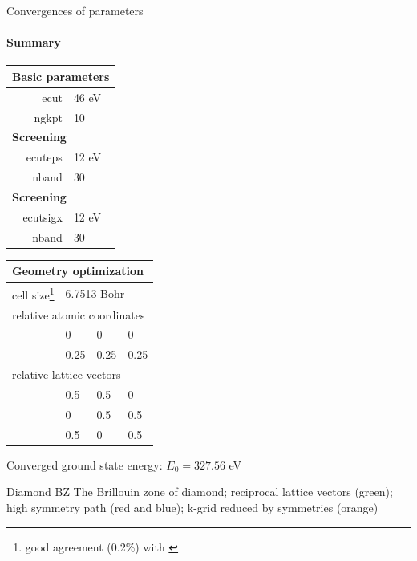\documentclass[fontsize=9pt]{beamer}
\begin{document}
\begin{frame}{Convergences of parameters}
     {
        \framesubtitle{Summary}
        \begin{center}
            \begin{tabular}{r l}
                \multicolumn{2}{l}{\textbf{Basic parameters}}
                \\\hline
                ecut & 46 eV \\
                ngkpt & 10
                \\\hline
                \multicolumn{2}{l}{\textbf{Screening}}
                \\\hline
                ecuteps & 12 eV \\
                nband & 30
                \\\hline
                \multicolumn{2}{l}{\textbf{Screening}}
                \\\hline
                ecutsigx & 12 eV \\
                nband & 30
                \\\hline
            \end{tabular}
            \hspace*{0.1cm}
            \begin{tabular}{r l l l}
                \multicolumn{4}{l}{\textbf{Geometry optimization}}
                \\\hline
                cell size\footnote{
                    good agreement (0.2\%) with \cite{diabands}
                } & \multicolumn{3}{l}{6.7513 Bohr} 
                \\\hline
                \multicolumn{4}{l}{relative atomic coordinates} \\
                & 0 & 0 & 0 \\
                & 0.25 & 0.25 & 0.25
                \\\hline
                \multicolumn{4}{l}{relative lattice vectors} \\
                & 0.5 & 0.5 & 0 \\
                & 0 & 0.5 & 0.5 \\
                & 0.5 & 0 & 0.5 
                \\\hline
            \end{tabular}
        \end{center}
        Converged ground state energy: $E_0 = 327.56$ eV
    }
\end{frame}

\begin{frame}{Diamond BZ}
    The Brillouin zone of diamond; reciprocal lattice vectors (green); high symmetry path (red and blue);
    k-grid reduced by symmetries (orange)

    \begin{center}
        \resizebox{0.5\linewidth}{!}{
            
        }
    \end{center}    
\end{frame}
\end{document}
